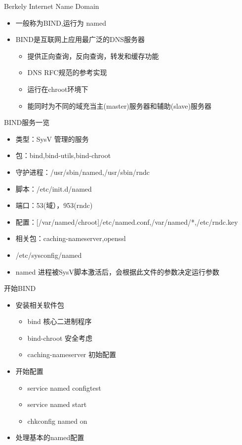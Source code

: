 \begin{frame}{Berkely Internet Name Domain}
\begin{itemize}
\item 一般称为BIND,运行为 named
\item BIND是互联网上应用最广泛的DNS服务器

\begin{itemize}
\item 提供正向查询，反向查询，转发和缓存功能
\item DNS RFC规范的参考实现
\item 运行在chroot环境下
\item 能同时为不同的域充当主(master)服务器和辅助(slave)服务器
\end{itemize}
\end{itemize}

\end{frame} 
\begin{frame}{BIND服务一览}
\begin{itemize}
\item 类型：SysV 管理的服务
\item 包：bind,bind-utils,bind-chroot
\item 守护进程：/usr/sbin/named,/usr/sbin/rndc
\item 脚本：/etc/init.d/named
\item 端口：53(域），953(rndc)
\item 配置：{[}/var/named/chroot{]}/etc/named.conf,/var/named/{*},/etc/rndc.key
\item 相关包：caching-nameserver,openssl
\item /etc/sysconfig/named
\item named 进程被SysV脚本激活后，会根据此文件的参数决定运行参数
\end{itemize}

\end{frame} 
\begin{frame}{开始BIND}
\begin{itemize}
\item 安装相关软件包

\begin{itemize}
\item bind 核心二进制程序
\item bind-chroot 安全考虑
\item caching-nameserver 初始配置
\end{itemize}
\item 开始配置

\begin{itemize}
\item service named configtest
\item service named start
\item chkconfig named on
\end{itemize}
\item 处理基本的named配置
\end{itemize}

\end{frame} 
